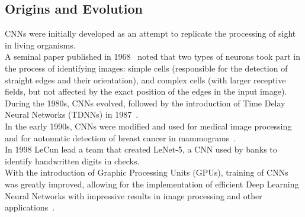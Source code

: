 \subsection{Origins and Evolution}
\label{sec:convolution:convolutionalneuralnetworks:originsandevolution}
CNNs were initially developed as an attempt to replicate the processing of sight in living organisms.\\
A seminal paper published in 1968~\citep{Hubel1968} noted that two types of neurons took part in the process of identifying images: simple cells (responsible for the detection of straight edges and their orientation), and complex cells (with larger receptive fields, but not affected by the exact position of the edges in the input image).\\
During the 1980s, CNNs evolved, followed by the introduction of Time Delay Neural Networks (TDNNs) in 1987~\citep{Waibel1989}.\\
In the early 1990s, CNNs were modified and used for medical image processing and for automatic detection of breast cancer in mammograms~\citep{Zang1994}.\\
In 1998 LeCun lead a team that created LeNet-5, a CNN used by banks to identify handwritten digits in checks.\\
With the introduction of Graphic Processing Units (GPUs), training of CNNs was greatly improved, allowing for the implementation of efficient Deep Learning Neural Networks with impressive results in image processing and other applications~\citep{Ciresan2013}.
